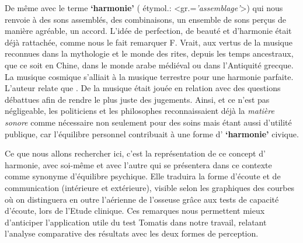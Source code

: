 De même avec le terme \textbf{`harmonie'} ( étymol.:
<gr.=\textit{'assemblage'}>) qui nous renvoie à
 des sons assemblés, des combinaisons, un ensemble de sons perçus de
 manière agréable, un accord. L'idée de perfection, de beauté et d'harmonie était déjà rattachée, comme 
 nous le fait remarquer F. Vrait, aux  vertus de la musique reconnues dans la mythologie et le
 monde des rites, depuis les temps ancestraux, que ce soit en Chine, dans le monde arabe
 médiéval ou dans l'Antiquité grecque. La musique cosmique s'alliait  à la musique terrestre pour une harmonie parfaite.
 L'auteur relate que  \autocite[80]{vrait_musicotherapie_2018}. De la musique était jouée en relation avec des questions débattues afin de rendre le plus juste des jugements.
Ainsi, et ce n'est pas négligeable, les  politiciens  et les
philosophes reconnaissaient déjà la \textit{matière sonore} comme nécessaire non seulement pour  des soins mais étant aussi d'utilité
publique, car l'équilibre personnel contribuait à une forme d' \textbf{`harmonie'} civique.
 
 
Ce que nous allons rechercher ici, c'est la représentation de ce concept d' harmonie, avec soi-même et 
avec l'autre qui se présentera dans ce contexte comme synonyme d'équilibre
psychique. Elle traduira la forme d'écoute et de communication (intérieure et
extérieure), visible selon les graphiques %
 des courbes %
 où on distinguera en outre l'aérienne de l'osseuse grâce aux tests de capacité 
 d'écoute, lors de l'Etude clinique.
Ces remarques nous permettent mieux d'anticiper
l'application utile du test Tomatis dans notre travail, relatant l'analyse
comparative des résultats avec les deux formes de perception.


